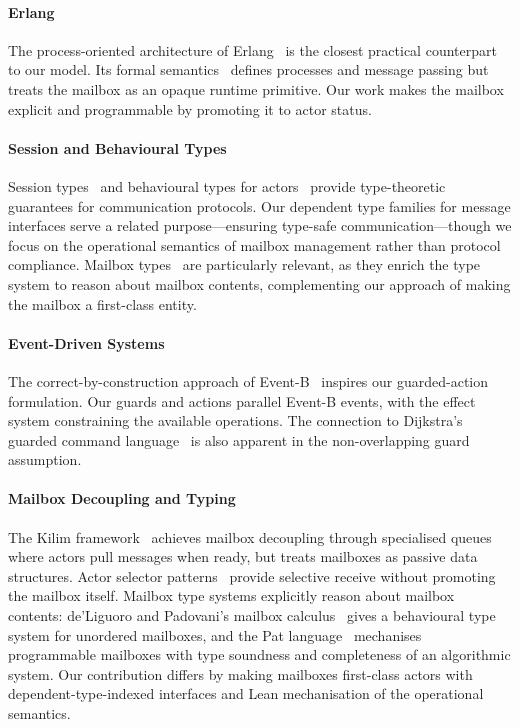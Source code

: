 \documentclass[
  a4paper,        %
  techreport,     %
]{art}
\begin{document}
\paragraph{Erlang}
The process-oriented
architecture of Erlang~\cite{erlang-2010,erlang} is the closest practical
counterpart to our model. Its formal
semantics~\cite{formal-semantics-erlang} defines processes and message
passing but treats the mailbox as an opaque runtime primitive. Our work
makes the mailbox explicit and programmable by promoting it to actor status.

\paragraph{Session and Behavioural Types}
Session types~\cite{honda2008mpst} and behavioural types for
actors~\cite{Fowler_2024,special-delivery-mailbox-types-2023} provide
type-theoretic guarantees for communication protocols. Our dependent type
families for message interfaces serve a related purpose---ensuring type-safe
communication---though we focus on the operational semantics of mailbox
management rather than protocol compliance.
Mailbox types~\cite{special-delivery-mailbox-types-2023} are particularly
relevant, as they enrich the type system to reason about mailbox contents,
complementing our approach of making the mailbox a first-class entity.

\paragraph{Event-Driven Systems}
The correct-by-construction approach of Event-B~\cite{dupont:tel-04165215}
inspires our guarded-action formulation. Our guards and actions parallel Event-B
events, with the effect system constraining the available operations. The
connection to Dijkstra's guarded command
language~\cite{dijkstra-guarded-commands} is also apparent in the non-overlapping
guard assumption.

\paragraph{Mailbox Decoupling and Typing}
The Kilim framework~\cite{kilim-framework} achieves mailbox decoupling through
specialised queues where actors pull messages when ready, but treats mailboxes
as passive data structures. Actor selector patterns~\cite{selectors-actors-2014}
provide selective receive without promoting the mailbox itself. Mailbox type
systems explicitly reason about mailbox contents: de'Liguoro and Padovani's
mailbox calculus~\cite{deliguoro-padovani-2018-mailbox} gives a behavioural
type system for unordered mailboxes, and the Pat language~\cite{fowler-2023-pat}
mechanises programmable mailboxes with type soundness and completeness of an
algorithmic system. Our contribution differs by making mailboxes first-class
actors with dependent-type-indexed interfaces and Lean mechanisation of the
operational semantics.
\end{document}
